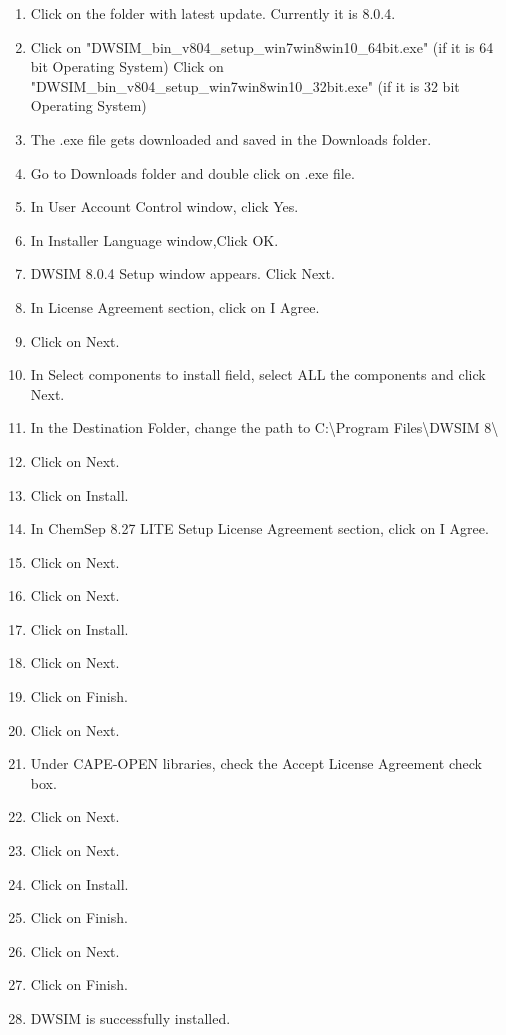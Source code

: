 \documentclass[a4paper,12pt]{article}
\begin{document}
\begin{enumerate}
\item Click on the folder with latest update. Currently it is 8.0.4.
\item Click on "DWSIM\_bin\_v804\_setup\_win7win8win10\_64bit.exe" (if it is 64 bit Operating System)
\newline Click on "DWSIM\_bin\_v804\_setup\_win7win8win10\_32bit.exe" (if it is 32 bit Operating System)
\item The .exe file gets downloaded and saved in the Downloads folder.
\item Go to Downloads folder and double click on .exe file.
\item In User Account Control window, click Yes.
\item In Installer Language window,Click OK.
\item DWSIM 8.0.4 Setup window appears. Click Next.
\item In License Agreement section, click on I Agree.
\item Click on Next.
\item In Select components to install field, select ALL the components and click Next.
\item In the Destination Folder, change the path to C:\textbackslash Program Files\textbackslash DWSIM 8\textbackslash
\item Click on Next.
\item Click on Install.
\item In ChemSep 8.27 LITE Setup License Agreement section, click on I Agree.
\item Click on Next.
\item Click on Next.
\item Click on Install.
\item Click on Next.
\item Click on Finish.
\item Click on Next.
\item Under CAPE-OPEN libraries, check the Accept License Agreement check box.
\item Click on Next.
\item Click on Next.
\item Click on Install.
\item Click on Finish.
\item Click on Next.
\item Click on Finish.
\item DWSIM is successfully installed.

\end{enumerate}
\end{document}
